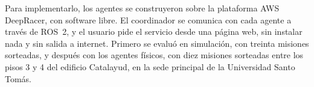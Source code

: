 Para implementarlo, los agentes se construyeron sobre la plataforma AWS DeepRacer, con software libre. El
coordinador se comunica con cada agente a través de ROS~2, y el usuario pide el
servicio desde una página web, sin instalar nada y
sin salida a internet. Primero se evaluó en simulación, con treinta misiones sorteadas, y después con los agentes físicos, con diez misiones sorteadas
entre los pisos 3 y 4 del edificio Catalayud, en la sede principal de la Universidad Santo Tomás.

